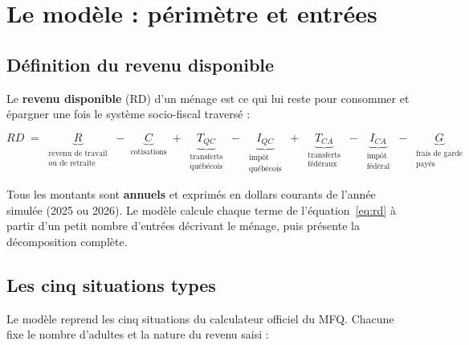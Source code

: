 \section{Le modèle : périmètre et entrées}
\label{sec:modele}

\subsection{Définition du revenu disponible}

Le \textbf{revenu disponible} (RD) d'un ménage est ce qui lui reste pour
consommer et épargner une fois le système socio-fiscal traversé :

\begin{equation}
\label{eq:rd}
RD \;=\; \underbrace{R}_{\substack{\text{revenu de travail}\\\text{ou de retraite}}}
\;-\; \underbrace{C}_{\text{cotisations}}
\;+\; \underbrace{T_{QC}}_{\substack{\text{transferts}\\\text{québécois}}}
\;-\; \underbrace{I_{QC}}_{\substack{\text{impôt}\\\text{québécois}}}
\;+\; \underbrace{T_{CA}}_{\substack{\text{transferts}\\\text{fédéraux}}}
\;-\; \underbrace{I_{CA}}_{\substack{\text{impôt}\\\text{fédéral}}}
\;-\; \underbrace{G}_{\substack{\text{frais de garde}\\\text{payés}}}
\end{equation}

Tous les montants sont \textbf{annuels} et exprimés en dollars courants de
l'année simulée (2025 ou 2026). Le modèle calcule chaque terme de
l'équation~\eqref{eq:rd} à partir d'un petit nombre d'entrées décrivant le
ménage, puis présente la décomposition complète.

\subsection{Les cinq situations types}

Le modèle reprend les cinq situations du calculateur officiel du MFQ. Chacune
fixe le nombre d'adultes et la nature du revenu saisi :

